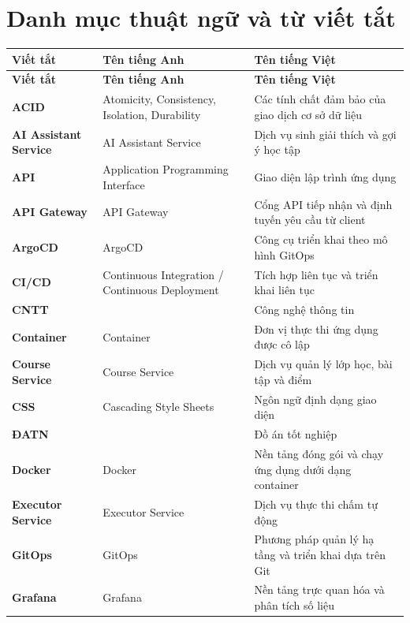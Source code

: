 \documentclass[../BTL.tex]{subfiles}
\begin{document}
\section*{Danh mục thuật ngữ và từ viết tắt}

\singlespacing
\setlength{\tabcolsep}{4pt}
\begin{longtable}{|p{3.2cm}|p{3.5cm}|p{7.1cm}|}
	\hline
   \textbf{Viết tắt} & \textbf{Tên tiếng Anh} & \textbf{Tên tiếng Việt} \\ \hline
	\endfirsthead
	\hline
   \textbf{Viết tắt} & \textbf{Tên tiếng Anh} & \textbf{Tên tiếng Việt} \\ \hline
	\endhead
	\hline
	\endfoot
	\hline
	\endlastfoot
	\textbf{ACID} & Atomicity, Consistency, Isolation, Durability & Các tính chất đảm bảo của giao dịch cơ sở dữ liệu\\ \hline
	\textbf{AI Assistant Service} & AI Assistant Service & Dịch vụ sinh giải thích và gợi ý học tập\\ \hline
	\textbf{API} & Application Programming Interface & Giao diện lập trình ứng dụng\\ \hline
	\textbf{API Gateway} & API Gateway & Cổng API tiếp nhận và định tuyến yêu cầu từ client\\ \hline
	\textbf{ArgoCD} & ArgoCD & Công cụ triển khai theo mô hình GitOps\\ \hline
	\textbf{CI/CD} & Continuous Integration / Continuous Deployment & Tích hợp liên tục và triển khai liên tục\\ \hline
	\textbf{CNTT} & & Công nghệ thông tin\\ \hline
	\textbf{Container} & Container & Đơn vị thực thi ứng dụng được cô lập\\ \hline
	\textbf{Course Service} & Course Service & Dịch vụ quản lý lớp học, bài tập và điểm\\ \hline
	\textbf{CSS} & Cascading Style Sheets & Ngôn ngữ định dạng giao diện\\ \hline
	\textbf{ĐATN} & & Đồ án tốt nghiệp\\ \hline
	\textbf{Docker} & Docker & Nền tảng đóng gói và chạy ứng dụng dưới dạng container\\ \hline
	\textbf{Executor Service} & Executor Service & Dịch vụ thực thi chấm tự động\\ \hline
	\textbf{GitOps} & GitOps & Phương pháp quản lý hạ tầng và triển khai dựa trên Git\\ \hline
	\textbf{Grafana} & Grafana & Nền tảng trực quan hóa và phân tích số liệu\\ \hline

\end{longtable}
\end{document}
